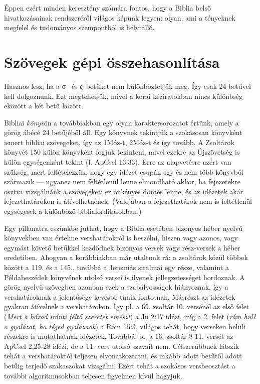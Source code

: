 \documentclass{article}
\newcommand\gr{\selectlanguage{greek}\frenchspacing}
\newcommand\hu{\selectlanguage{magyar}\frenchspacing}
\begin{document}
Éppen ezért minden keresztény számára fontos, hogy a Biblia belső hivatkozásainak rendszeréről világos képünk legyen:
olyan, ami a tényeknek megfelel és tudományos szempontból is helytálló.

\section{Szövegek gépi összehasonlítása}

Hasznos lesz, ha a \gr σ  \hu\ és \gr ς\hu\ betűket nem különböztetjük meg. Így csak 24 betűvel kell dolgoznunk.
Ezt megtehetjük, mivel a korai kéziratokban nincs különbség eközött a két betű között.

Bibliai \textit{könyv}ön a továbbiakban egy olyan karaktersorozatot értünk, amely a görög ábécé 24
betűjéből áll. Egy könyvnek tekintjük a szokásosan könyvként ismert bibliai szövegeket,
így az 1Móz-t, 2Móz-t és így tovább. A Zsoltárok könyvét 150 külön könyvként fogjuk tekinteni,
mivel ezekre az Újszövetség is külön egységenként tekint (l. ApCsel 13:33).
Erre az alapvetésre azért van szükség, mert feltételezzük, hogy egy idézet csupán egy és nem több
könyvből származik --- ugyanez nem feltétlenül lenne elmondható akkor, ha fejezetekre osztva
vizsgálnánk a szövegeket: ez önkényes döntés lenne, és az idézetek akár fejezethatárokon is átívelhetnének.
(Valójában a fejezethatárok nem is feltétlenül egységesek a különböző bibliafordításokban.)

Egy pillanatra eszünkbe juthat, hogy a Biblia esetében bizonyos héber nyelvű könyvekben van értelme vershatárokról is
beszélni, hiszen vagy azonos, vagy egymást követő betűkkel kezdődnek bizonyos versek vagy rész-versek a héber
eredetiben. Ahogyan a korábbiakban már utaltunk rá: a zsoltárok közül többek között a 119. és a 145.,
továbbá a Jeremiás siralmai egy része, valamint a Példabeszédek könyvének utolsó versei is ilyenek jellegzetességet
hordoznak.
A görög nyelvű szövegben azonban ezek a szabályosságok hiányoznak, így a vershatároknak
a jelentősége kevésbé tűnik fontosnak. Másrészt az idézetek gyakran átívelnek a vershatárokon.
Így pl. a 69. zsoltár 10. versénél az első felet (\textit{Mert a házad
iránti féltő szeretet emészt}) a Jn 2:17 idézi, míg a 2. felet (\textit{rám hull a gyalázat, ha téged gyaláznak})
a Róm 15:3, világos tehát, hogy verseken belüli részekre is mutathatnak idézetek. Továbbá, pl. a 16. zsoltár
8-11. versét az ApCsel 2,25-28 idézi, de a 11. vers utolsó szavait nem. Célszerűbbnek látszik tehát
a vershatároktól teljesen elvonatkoztatni, és inkább adott betűtől adott betűig terjedő szakaszokat vizsgálni.
Ezért tehát a szokásos versbeosztást a további algoritmusokban teljesen figyelmen kívül hagyjuk.
\end{document}
